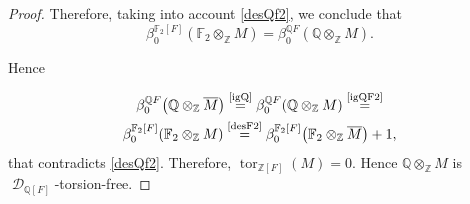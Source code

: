 \documentclass{amsart}
\theoremstyle{definition}
\theoremstyle{remark}
\DeclareMathOperator{\D}{\mathcal D}
\DeclareMathOperator{\tor}{tor}
\newcommand{\myeq}[1]{\ensuremath{\stackrel{\text{#1}}{=}}}
\newcommand{\Z}{\mathbb{Z}}
\newcommand{\Q}{\mathbb{Q}}
\begin{document}
\begin{proof}
Therefore, taking into account \cref{desQf2}, we conclude that 
\begin{equation}
    \label{igQF2}
\beta_0^{\mathbb{F}_2[F]}\!\left(\mathbb{F}_2 \otimes_{\mathbb{Z}} M\right) 
   = \beta_0^{\mathbb{Q}F}\!\left(\mathbb{Q} \otimes_{\mathbb{Z}} M\right).
\end{equation}

Hence 

\begin{multline*}
\beta_0^{\mathbb{Q}F}\!\left(\mathbb{Q} \otimes_{\mathbb{Z}} \overline M\right) 
   \myeq{\cref{igQ}} \beta_0^{\mathbb{Q}F}\!\left(\mathbb{Q} \otimes_{\mathbb{Z}} M \right)
   \myeq{\cref{igQF2}}\\
   \beta_0^{\mathbb{F}_2[F]}\!\left(\mathbb{F}_2 \otimes_{\mathbb{Z}} M\right) 
   \myeq{\cref{desF2}} \beta_0^{\mathbb{F}_2[F]}\!\left(\mathbb{F}_2 \otimes_{\mathbb{Z}} \overline M\right) +1,
   \end{multline*}
 that contradicts \cref{desQf2}.
Therefore, $  \tor_{\Z[F]}(M)=0$.   Hence $ \Q\otimes_\Z M$ is  $\D_{\Q[F]}$-torsion-free.
 \renewcommand\qedsymbol{$\diamond$}\end{proof}
  
 
\end{document}
